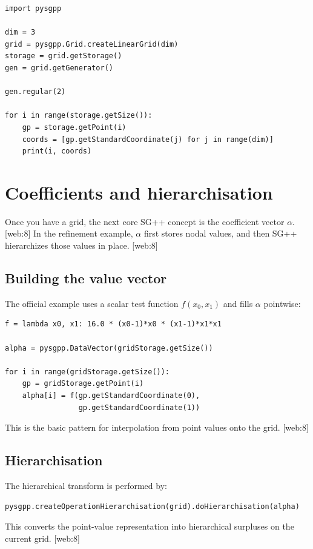 \documentclass[11pt,a4paper]{article}
\begin{document}
\begin{lstlisting}[style=py]
import pysgpp

dim = 3
grid = pysgpp.Grid.createLinearGrid(dim)
storage = grid.getStorage()
gen = grid.getGenerator()

gen.regular(2)

for i in range(storage.getSize()):
    gp = storage.getPoint(i)
    coords = [gp.getStandardCoordinate(j) for j in range(dim)]
    print(i, coords)
\end{lstlisting}

\section{Coefficients and hierarchisation}

Once you have a grid, the next core SG++ concept is the coefficient vector \(\alpha\). [web:8]  
In the refinement example, \(\alpha\) first stores nodal values, and then SG++ hierarchizes those values in place. [web:8]  

\subsection{Building the value vector}
The official example uses a scalar test function \(f(x_0,x_1)\) and fills \(\alpha\) pointwise:
\begin{lstlisting}[style=py]
f = lambda x0, x1: 16.0 * (x0-1)*x0 * (x1-1)*x1*x1

alpha = pysgpp.DataVector(gridStorage.getSize())

for i in range(gridStorage.getSize()):
    gp = gridStorage.getPoint(i)
    alpha[i] = f(gp.getStandardCoordinate(0),
                 gp.getStandardCoordinate(1))
\end{lstlisting}
This is the basic pattern for interpolation from point values onto the grid. [web:8]  

\subsection{Hierarchisation}
The hierarchical transform is performed by:
\begin{lstlisting}[style=py]
pysgpp.createOperationHierarchisation(grid).doHierarchisation(alpha)
\end{lstlisting}
This converts the point-value representation into hierarchical surpluses on the current grid. [web:8]  
\end{document}
